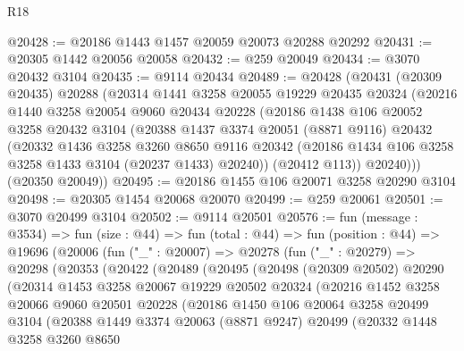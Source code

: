 \begin{lexlean}{R18}
\begin{coremodule}
@20428 := @20186 @1443 @1457 @20059 @20073 @20288 @20292
@20431 := @20305 @1442 @20056 @20058
@20432 := @259 @20049
@20434 := @3070 @20432 @3104
@20435 := @9114 @20434
@20489 := @20428
    (@20431
      (@20309 @20435)
      @20288
      (@20314
        @1441
        @3258
        @20055
        @19229
        @20435
        @20324
        (@20216
          @1440
          @3258
          @20054
          @9060
          @20434
          @20228
          (@20186
            @1438
            @106
            @20052
            @3258
            @20432
            @3104
            (@20388
              @1437
              @3374
              @20051
              (@8871 @9116)
              @20432
              (@20332
                @1436
                @3258
                @3260
                @8650
                @9116
                @20342
                (@20186 @1434 @106 @3258 @3258 @1433 @3104 (@20237 @1433) @20240))
              (@20412 @113))
            @20240)))
      (@20350 @20049))
@20495 := @20186 @1455 @106 @20071 @3258 @20290 @3104
@20498 := @20305 @1454 @20068 @20070
@20499 := @259 @20061
@20501 := @3070 @20499 @3104
@20502 := @9114 @20501
@20576 := fun (message : @3534) =>
  fun (size : @44) =>
  fun (total : @44) =>
  fun (position : @44) =>
  @19696
    (@20006
      (fun ("_" : @20007) =>
      @20278
        (fun ("_" : @20279) =>
        @20298
          (@20353
            (@20422
              (@20489
                (@20495
                  (@20498
                    (@20309 @20502)
                    @20290
                    (@20314
                      @1453
                      @3258
                      @20067
                      @19229
                      @20502
                      @20324
                      (@20216
                        @1452
                        @3258
                        @20066
                        @9060
                        @20501
                        @20228
                        (@20186
                          @1450
                          @106
                          @20064
                          @3258
                          @20499
                          @3104
                          (@20388
                            @1449
                            @3374
                            @20063
                            (@8871 @9247)
                            @20499
                            (@20332
                              @1448
                              @3258
                              @3260
                              @8650

\end{coremodule}
\end{lexlean}
